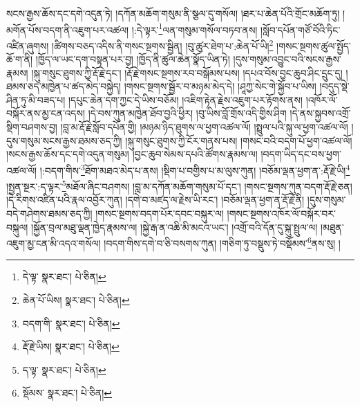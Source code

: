 སངས་རྒྱས་ཆོས་དང་དགེ་འདུན་ཏེ། །དཀོན་མཆོག་གསུམ་ནི་སྩལ་དུ་གསོལ། །ཐར་པ་ཆེན་པོའི་གྲོང་མཆོག་ཏུ། །མགོན་པོས་བདག་ནི་འཇུག་པར་འཚལ། །:དེ་ལྟར་\footnote{དེ་ལྟ་  སྣར་ཐང་།  པེ་ཅིན། }ལན་གསུམ་གསོལ་བཏབ་ནས། །སློབ་དཔོན་གཙོ་བོའི་ཏིང་འཛིན་ཞུགས། །ཚིགས་བཅད་འདིས་ནི་གསང་སྔགས་སྦྱིན། །བུ་ཚུར་ཐེག་པ་:ཆེན་པོ་ཡི།\footnote{ཆེན་པོ་ཡིས།  སྣར་ཐང་།  པེ་ཅིན། } །གསང་སྔགས་ཚུལ་སྤྱོད་ཆོ་ག་ནི། །ཁྱོད་ལ་ཡང་དག་བསྟན་པར་བྱ། །ཁྱོད་ནི་ཚུལ་ཆེན་སྣོད་ཡིན་ཏེ། །དུས་གསུམ་འབྱུང་བའི་སངས་རྒྱས་རྣམས། །སྐུ་གསུང་ཐུགས་ཀྱི་རྡོ་རྗེ་དང་། །རྡོ་རྗེ་གསང་སྔགས་རབ་བསྒོམས་པས། །དཔའ་བོས་བྱང་ཆུབ་ཤིང་དྲུང་དུ། །ཐམས་ཅད་མཁྱེན་པ་ཚད་མེད་བསྐྱེད། །གསང་སྔགས་སྦྱོར་བ་མཉམ་མེད་དེ། །ཤཱཀྱ་སེང་གེ་སྐྱོབ་པ་ཡིས། །བདུད་སྡེ་ཤིན་ཏུ་མི་བཟད་པ། །དཔུང་ཆེན་དག་ཀྱང་དེ་ཡིས་བཅོམ། །འཇིག་རྟེན་རྗེས་འཇུག་པར་རྟོགས་ནས། །འཁོར་ལོ་བསྐོར་ནས་མྱ་ངན་འདས། །དེ་བས་ཀུན་མཁྱེན་ཐོབ་བྱའི་ཕྱིར། །བུ་ཡིས་བློ་གྲོས་འདི་གྱིས་ཤིག །དེ་ནས་སྐྱབས་འགྲོ་སྡིག་བཤགས་བྱ། །བླ་མ་རྡོ་རྗེ་སློབ་དཔོན་གྱི། །མཉམ་ཉིད་ཐུགས་ལ་ཕྱག་འཚལ་ལོ། །སྤྲུལ་པའི་སྐུ་ལ་ཕྱག་འཚལ་ལོ། །དུས་གསུམ་སངས་རྒྱས་ཐམས་ཅད་ཀྱི། །སྐུ་གསུང་ཐུགས་ཀྱི་ངོར་གནས་པས། །གསང་བའི་བདག་པོ་ཕྱག་འཚལ་ལོ། །སངས་རྒྱས་ཆོས་དང་དགེ་འདུན་གསུམ། །བྱང་ཆུབ་སེམས་དཔའི་ཚོགས་རྣམས་ལ། །བདག་ཡིད་དང་བས་ཕྱག་འཚལ་ལོ། །:བདག་གིས་\footnote{བདག་གི་  སྣར་ཐང་།  པེ་ཅིན། }ཐོག་མཐའ་མེད་པ་ནས། །སྡིག་པ་བགྱིས་པ་མ་ལུས་ཀུན། །བཅོམ་ལྡན་ཕྱག་ན་:རྡོ་རྗེ་ཡི།\footnote{རྡོ་རྗེ་ཡིས།  སྣར་ཐང་།  པེ་ཅིན། } །སྤྱན་སྔར་:ད་ལྟར་\footnote{ད་ལྟ་  སྣར་ཐང་།  པེ་ཅིན། }མཐོལ་ཞིང་བཤགས། །བླ་མ་དཀོན་མཆོག་གསུམ་པོ་དང་། །གསང་སྔགས་ཀུན་བདག་རྡོ་རྗེ་ཅན། །དེ་རིགས་འཛིན་པའི་རྣལ་འབྱོར་ཀུན། །དགེ་བ་མཛད་ལ་རྗེས་ཡི་རང་། །བཅོམ་ལྡན་ཕྱག་ན་རྡོ་རྗེ་ནི། །དུས་གསུམ་བདེ་གཤེགས་ཐམས་ཅད་ཀྱི། །གསང་སྔགས་བདག་པོར་དབང་བསྐུར་ལ། །གསང་སྔགས་འཁོར་ལོ་བསྐོར་བར་བསྐུལ། །སྐྱོན་བྲལ་མཐུ་ལྡན་ཁྱེད་རྣམས་ལ། །སྐྱེ་རྒ་ན་འཆི་མི་མངའ་ཡང་། །འགྲོ་བའི་དོན་དུ་སྐུ་སྤྲུལ་ལ། །མཐུན་འཇུག་མྱ་ངན་མི་འདའ་གསོལ། །བདག་གིས་དགེ་བ་ཅི་བསགས་ཀུན། །གཅིག་ཏུ་བསྡུས་ཏེ་བསྡོམས་\footnote{སྡོམས་  སྣར་ཐང་།  པེ་ཅིན། }ནས་སུ། །
